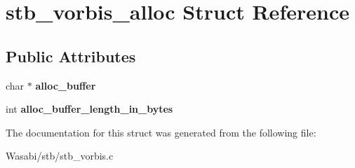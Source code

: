 \hypertarget{structstb__vorbis__alloc}{}\section{stb\+\_\+vorbis\+\_\+alloc Struct Reference}
\label{structstb__vorbis__alloc}
\subsection*{Public Attributes}
\begin{DoxyCompactItemize}
\item 
char $\ast$ {\bfseries alloc\+\_\+buffer}\hypertarget{structstb__vorbis__alloc_a0bb516f56fb154f942d7c8641d33a26e}{}\label{structstb__vorbis__alloc_a0bb516f56fb154f942d7c8641d33a26e}

\item 
int {\bfseries alloc\+\_\+buffer\+\_\+length\+\_\+in\+\_\+bytes}\hypertarget{structstb__vorbis__alloc_a04baf605f33de80c7161b27fb2ec5d86}{}\label{structstb__vorbis__alloc_a04baf605f33de80c7161b27fb2ec5d86}

\end{DoxyCompactItemize}


The documentation for this struct was generated from the following file\+:\begin{DoxyCompactItemize}
\item 
Wasabi/stb/stb\+\_\+vorbis.\+c\end{DoxyCompactItemize}
